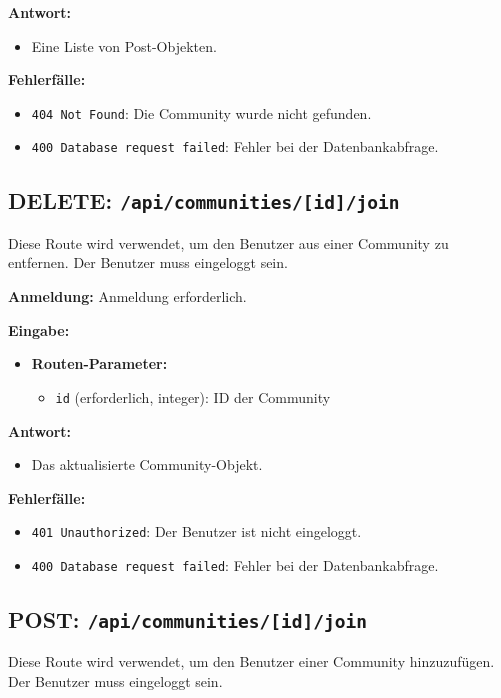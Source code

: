 \documentclass[a4paper,12pt]{article}
\begin{document}
\textbf{Antwort:}
\begin{itemize}
    \item Eine Liste von Post-Objekten.
\end{itemize}

\textbf{Fehlerfälle:}
\begin{itemize}
    \item \texttt{404 Not Found}: Die Community wurde nicht gefunden.
    \item \texttt{400 Database request failed}: Fehler bei der Datenbankabfrage.
\end{itemize}

\subsection{DELETE: \texttt{/api/communities/[id]/join}}

Diese Route wird verwendet, um den Benutzer aus einer Community zu entfernen. Der Benutzer muss eingeloggt sein.

\textbf{Anmeldung:} Anmeldung erforderlich.

\textbf{Eingabe:}
\begin{itemize}
    \item \textbf{Routen-Parameter:}
    \begin{itemize}
        \item \texttt{id} (erforderlich, integer): ID der Community
    \end{itemize}
\end{itemize}

\textbf{Antwort:}
\begin{itemize}
    \item Das aktualisierte Community-Objekt.
\end{itemize}

\textbf{Fehlerfälle:}
\begin{itemize}
    \item \texttt{401 Unauthorized}: Der Benutzer ist nicht eingeloggt.
    \item \texttt{400 Database request failed}: Fehler bei der Datenbankabfrage.
\end{itemize}

\subsection{POST: \texttt{/api/communities/[id]/join}}

Diese Route wird verwendet, um den Benutzer einer Community hinzuzufügen. Der Benutzer muss eingeloggt sein.
\end{document}
